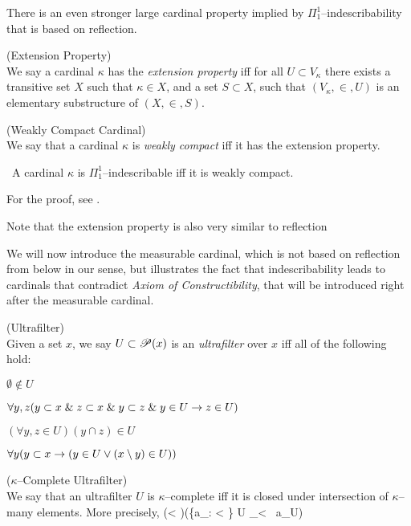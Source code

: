There is an even stronger large cardinal property implied by $\Pi_1^1$–indescribability that is based on reflection.

\begin{definition}{(Extension Property)}\label{def:extension_property}\\
We say a cardinal $\kappa$ has the \emph{extension property} iff for all $U \subset V_\kappa$ there exists a transitive set $X$ such that $\kappa \in X$, and a set $S \subset X$, such that $(V_\kappa, \in, U)$ is an elementary substructure of $(X, \in, S)$.
\end{definition}

\begin{definition}{(Weakly Compact Cardinal)}\label{def:weakly_compact_cardinal}\\
We say that a cardinal $\kappa$ is \emph{weakly compact} iff it has the extension property.
\end{definition}

\begin{theorem}\
A cardinal $\kappa$ is $\Pi_1^1$–indescribable iff it is weakly compact.
\end{theorem}
For the proof, see \cite{KanamoriBook}. %

Note that the extension property is also very similar to reflection

We will now introduce the measurable cardinal, which is not based on reflection from below in our sense, but illustrates the fact that indescribability leads to cardinals that contradict \emph{Axiom of Constructibility}, that will be introduced right after the measurable cardinal.
\begin{definition}{(Ultrafilter)}\\
Given a set $x$, we say $U \subset \mathscr{P} (x)$ is an \emph{ultrafilter} over $x$ iff all of the following hold:
\bce[(i)]
\item $\emptyset \not\in U$
\item $\forall y, z (y \subset x \mathrel{\&} z \subset x \mathrel{\&} y \subset z \mathrel{\&} y \in U \rightarrow z \in U)$
\item $(\forall y, z \in U)(y \cap z) \in U$
\item $\forall y (y \subset x \rightarrow (y \in U \lor (x \setminus y) \in U))$
\ece
\end{definition}

\begin{definition}{($\kappa$–Complete Ultrafilter)}\\
We say that an ultrafilter $U$ is $\kappa$–complete iff it is closed under intersection of $\kappa$–many elements. More precisely,
\beq
(\forall \gamma < \kappa)(\{a_\alpha : \alpha < \gamma \} \subseteq U \then \bigcup_{\alpha < \gamma} a_\alpha \in U)
\eeq
\end{definition}

